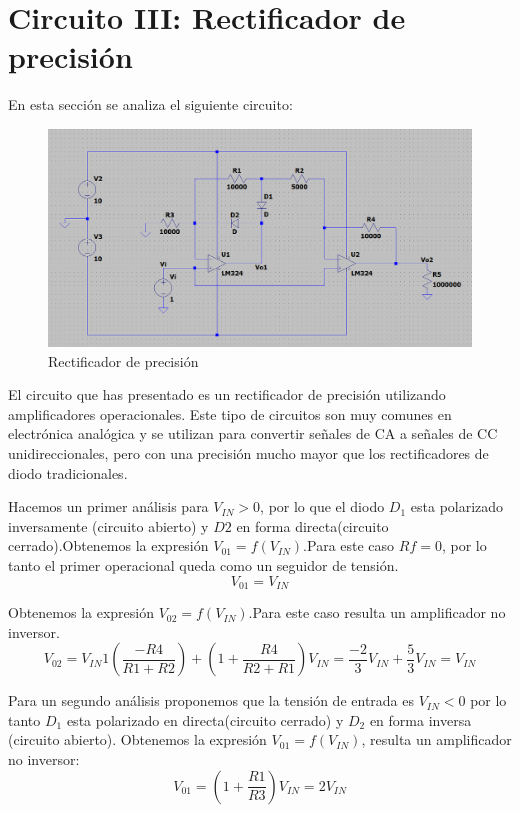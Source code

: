 \documentclass[12pt]{article}
\begin{document}
		
	\section{Circuito III: Rectificador de precisión}
	En esta sección se analiza el siguiente circuito:
	\begin{figure}[h]
		\centering
		\includegraphics[width=1\linewidth]{Simulaciones-Resultados/Circuito3_esquematico}
		\caption{Rectificador de precisión}
		\label{fig:circuito3esquematico}
	\end{figure}
	El circuito que has presentado es un rectificador de precisión utilizando amplificadores operacionales. Este tipo de circuitos son muy comunes en electrónica analógica y se utilizan para convertir señales de CA a señales de CC unidireccionales, pero con una precisión mucho mayor que los rectificadores de diodo tradicionales.
		
	Hacemos un primer análisis para $V_{IN}>0$, por lo que el diodo $D_1$
	esta polarizado inversamente (circuito abierto) y $D2$ en forma directa(circuito cerrado).Obtenemos la expresión $V_{01}=f(V_{IN})$.Para este caso $Rf=0$, por lo tanto el primer operacional queda como un seguidor de tensión.
	\begin{equation}
		V_{01}=V_{IN}
	\end{equation}
	
	Obtenemos la expresión  $V_{02}=f(V_{IN})$.Para este caso resulta un amplificador no inversor.
	\begin{equation}
		V_{02}=V_{IN}1(\frac{-R4}{R1+R2})+(1+\frac{R4}{R2+R1})V_{IN}=\frac{-2}{3}V_{IN}+\frac{5}{3}V_{IN}=V_{IN}
	\end{equation}
	
		
	Para un segundo análisis proponemos que la tensión de entrada es $V_{IN}<0$ por lo tanto $D_1$ esta polarizado en directa(circuito cerrado) y $D_2$ en forma inversa (circuito abierto). Obtenemos la expresión $V_{01}=f(V_{IN})$, resulta un amplificador no inversor:
	\begin{equation}
		V_{01}=(1+\frac{R1}{R3})V_{IN}=2V_{IN}
	\end{equation}
	
\end{document}

